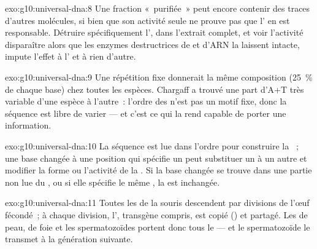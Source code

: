 \begin{solution}{exo:g10:universal-dna:8}
Une fraction «~purifiée~» peut encore contenir des traces d'autres
molécules, si bien que son activité seule ne prouve pas que l' en
est responsable. Détruire spécifiquement l', dans l'extrait complet,
et voir l'activité disparaître alors que les enzymes destructrices de
 et d'ARN la laissent intacte, impute l'effet à l' et à
rien d'autre.
\end{solution}

\begin{solution}{exo:g10:universal-dna:9}
Une répétition fixe donnerait la même composition (25~\% de chaque
base) chez toutes les espèces. Chargaff a trouvé une part d'A+T très
variable d'une espèce à l'autre~: l'ordre des  n'est pas un motif
fixe, donc la séquence est libre de varier --- et c'est ce qui la rend
capable de porter une information.
\end{solution}

\begin{solution}{exo:g10:universal-dna:10}
La séquence est lue dans l'ordre pour construire la ~; une
base changée à une position qui spécifie un  peut
substituer un  à un autre et modifier la forme ou
l'activité de la . Si la base changée se trouve dans une partie
non lue du , ou si elle spécifie le même , la 
est inchangée.
\end{solution}

\begin{solution}{exo:g10:universal-dna:11}
Toutes les  de la souris descendent par divisions de l'œuf
fécondé~; à chaque division, l', transgène compris, est copié
() et partagé. Les  de peau, de foie et les
spermatozoïdes portent donc tous le  --- et le spermatozoïde le
transmet à la génération suivante.
\end{solution}

